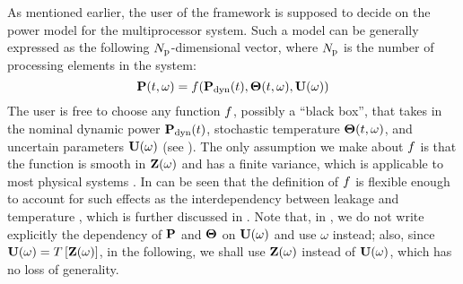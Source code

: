 As mentioned earlier, the user of the framework is supposed to decide on the power model for the multiprocessor system. Such a model can be generally expressed as the following ${N_\text{p}}$-dimensional vector, where ${N_\text{p}}$ is the number of processing elements in the system:
\begin{equation} \elabel{power-model}
  \vP(\t, \o) = \f(\vP_\dyn(\t), \vTO(\t, \o), \vU(\o))
\end{equation}
The user is free to choose any function $f$, possibly a ``black box'', that takes in the nominal dynamic power $\mathbf{P}_{\text{dyn}}(t)$, stochastic temperature ${\boldsymbol\Theta}(t, \omega)$, and uncertain parameters $\mathbf{U}(\omega)$ (see ). The only assumption we make about $f$ is that the function is smooth in $\mathbf{Z}(\omega)$ and has a finite variance, which is applicable to most physical systems \cite{xiu2002}. In can be seen that the definition of $f$ is flexible enough to account for such effects as the interdependency between leakage and temperature \cite{srivastava2010, liu2007}, which is further discussed in . Note that, in , we do not write explicitly the dependency of $\mathbf{P}$ and ${\boldsymbol\Theta}$ on $\mathbf{U}(\omega)$ and use $\omega$ instead; also, since $\mathbf{U}(\omega) = T\left[\mathbf{Z}(\omega)\right]$, in the following, we shall use $\mathbf{Z}(\omega)$ instead of $\mathbf{U}(\omega)$, which has no loss of generality.
